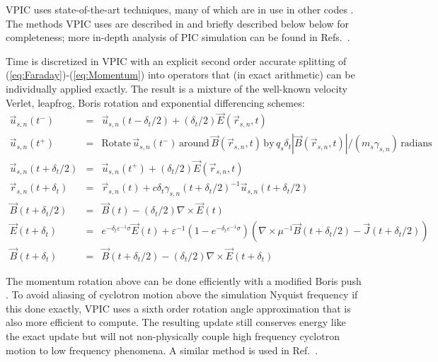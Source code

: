 \documentclass[10pt]{article}
\newcommand{\eps}{\varepsilon}
\newcommand{\vecr}{\vec{r}}
\newcommand{\vecu}{\vec{u}}
\newcommand{\vecJ}{\vec{J}}
\newcommand{\vecE}{\vec{E}}
\newcommand{\vecB}{\vec{B}}
\newcommand{\Curl}[1]{\nabla \times #1}
\newcommand{\eq}[1]{(\ref{eq:#1})}
\begin{document}
VPIC uses state-of-the-art techniques, many of which are in use in
other codes
\cite{Kwan_Snell_1985,Verboncoeur_et_al_1995,Eastwood_et_al_1995,Jones_et_al_1996,Blahovec_et_al_2000,Nieter_Cary_2004}.
The methods VPIC uses are described in
\cite{Bowers_et_al_Phys_Plasmas_2007} and briefly described below
below for completeness; more in-depth analysis of PIC simulation can
be found in Refs.~\cite{Birdsall_Langdon_1985,Hockney_Eastwood_1988}.

Time is discretized in VPIC with an explicit second order accurate
splitting of \eq{Faraday}-\eq{Momentum} into operators that (in exact
arithmetic) can be individually applied exactly.  The result is a
mixture of the well-known velocity Verlet, leapfrog, Boris rotation
and exponential differencing schemes:
\begin{eqnarray}
\vecu_{s,n}\left(t^-\right) &=&\vecu_{s,n}\left(t-\delta_t/2\right) +
  \left(\delta_t/2\right)\vecE\left(\vecr_{s,n},t\right) \\
\vecu_{s,n}\left(t^+\right) &=&
  \textrm{Rotate}\,\vecu_{s,n}\left(t^-\right)\,\textrm{around}\,
  \vecB\left(\vecr_{s,n},t\right)\,\textrm{by}\,
  q_s\delta_t\left|\vecB\left(\vecr_{s,n},t\right)\right| /
  \left(m_s\gamma_{s,n}\right)\,\textrm{radians} \\
\vecu_{s,n}\left(t+\delta_t/2\right) &=&\vecu_{s,n}\left(t^+\right) +
  \left(\delta_t/2\right)\vecE\left(\vecr_{s,n},t\right) \\
\vecr_{s,n}\left(t+\delta_t\right) &=& \vecr_{s,n}\left(t\right) +
  c\delta_t\gamma_{s,n}\left(t+\delta_t/2\right)^{-1}
           \vecu_{s,n}\left(t+\delta_t/2\right) \\
\vecB\left(t+\delta_t/2\right) &=&
  \vecB\left(t\right) -
  \left(\delta_t/2\right)\Curl{\vecE\left(t\right)} \\
\vecE\left(t+\delta_t\right) &=&
  e^{-\delta_t\eps^{-1}\sigma}\vecE\left(t\right) +
  \eps^{-1}\left(1-e^{-\delta_t\eps^{-1}\sigma}\right)
    \left( \Curl{\mu^{-1}\vecB\left(t+\delta_t/2\right)} -
           \vecJ\left(t+\delta_t/2\right) \right) \\
\vecB\left(t+\delta_t\right) &=& \vecB\left(t+\delta_t/2\right) -
  \left(\delta_t/2\right)\Curl{\vecE\left(t+\delta_t\right)}
\end{eqnarray}

The momentum rotation above can be done efficiently with a modified
Boris push \cite{Boris_1970}.  To avoid aliasing of cyclotron motion
above the simulation Nyquist frequency if this done exactly, VPIC uses
a sixth order rotation angle approximation that is also more efficient
to compute.  The resulting update still conserves energy like the
exact update but will not non-physically couple high frequency
cyclotron motion to low frequency phenomena.  A similar method is used
in Ref.~\cite{Blahovec_et_al_2000}.
\end{document}
